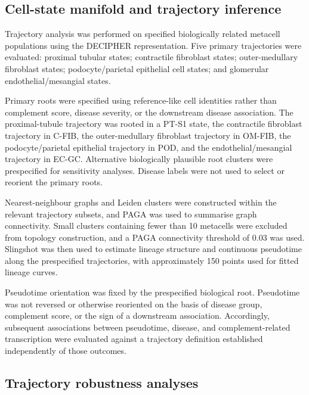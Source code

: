 \documentclass[10pt,letterpaper]{article}
\begin{document}
\subsection*{Cell-state manifold and trajectory inference}

Trajectory analysis was performed on specified biologically related metacell populations using the DECIPHER representation. Five primary trajectories were evaluated: proximal tubular states; contractile fibroblast states; outer-medullary fibroblast states; podocyte/parietal epithelial cell states; and glomerular endothelial/mesangial states.

Primary roots were specified using reference-like cell identities rather than complement score, disease severity, or the downstream disease association. The proximal-tubule trajectory was rooted in a PT-S1 state, the contractile fibroblast trajectory in C-FIB, the outer-medullary fibroblast trajectory in OM-FIB, the podocyte/parietal epithelial trajectory in POD, and the endothelial/mesangial trajectory in EC-GC. Alternative biologically plausible root clusters were prespecified for sensitivity analyses. Disease labels were not used to select or reorient the primary roots.

Nearest-neighbour graphs and Leiden clusters \cite{Traag_Waltman2019} were constructed within the relevant trajectory subsets, and PAGA \cite{Wolf_Hamey_Plass_Solana_Dahlin_Göttgens_Rajewsky_Simon_Theis_2019} was used to summarise graph connectivity. Small clusters containing fewer than 10 metacells were excluded from topology construction, and a PAGA connectivity threshold of 0.03 was used. Slingshot \cite{Street_Risso_Fletcher_Das_Ngai_Yosef_Purdom_Dudoit_2018} was then used to estimate lineage structure and continuous pseudotime along the prespecified trajectories, with approximately 150 points used for fitted lineage curves.

Pseudotime orientation was fixed by the prespecified biological root. Pseudotime was not reversed or otherwise reoriented on the basis of disease group, complement score, or the sign of a downstream association. Accordingly, subsequent associations between pseudotime, disease, and complement-related transcription were evaluated against a trajectory definition established independently of those outcomes.

\subsection*{Trajectory robustness analyses}
\end{document}
